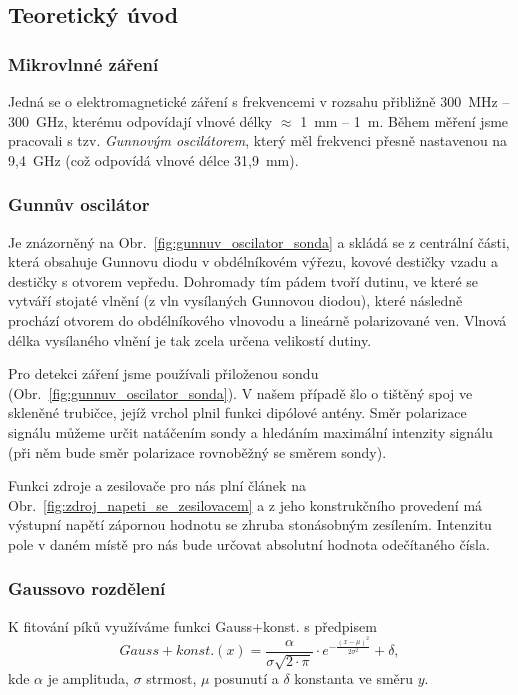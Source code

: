 \documentclass[english]{article}
\begin{document}
	\subsection{Teoretický úvod}
		\subsubsection{Mikrovlnné záření}
				Jedná se o elektromagnetické záření s frekvencemi v rozsahu přibližně 300~MHz -- 300~GHz, kterému odpovídají vlnové délky $\approx$ 1~mm -- 1~m. Během měření jsme pracovali s tzv. \emph{Gunnovým oscilátorem}, který měl frekvenci přesně nastavenou na 9,4~GHz (což odpovídá vlnové délce 31,9~mm).
						
		\subsubsection{Gunnův oscilátor}
				Je znázorněný na Obr.~\ref{fig:gunnuv_oscilator_sonda} a skládá se z centrální části, která obsahuje Gunnovu diodu v obdélníkovém výřezu, kovové destičky vzadu a destičky s otvorem vepředu. Dohromady tím pádem tvoří dutinu, ve které se vytváří stojaté vlnění (z vln vysílaných Gunnovou diodou), které následně prochází otvorem do obdélníkového vlnovodu a lineárně polarizované ven. Vlnová délka vysílaného vlnění je tak zcela určena velikostí dutiny. 
				
				Pro detekci záření jsme používali přiloženou sondu (Obr.~\ref{fig:gunnuv_oscilator_sonda}). V našem případě šlo o tištěný spoj ve skleněné trubičce, jejíž vrchol plnil funkci dipólové antény. Směr polarizace signálu můžeme určit natáčením sondy a hledáním maximální intenzity signálu (při něm bude směr polarizace rovnoběžný se směrem sondy). 
				
				Funkci zdroje a zesilovače pro nás plní článek na Obr.~\ref{fig:zdroj_napeti_se_zesilovacem} a z jeho konstrukčního provedení má výstupní napětí zápornou hodnotu se zhruba stonásobným zesílením. Intenzitu pole v daném místě pro nás bude určovat absolutní hodnota odečítaného čísla.
							
		\subsubsection{Gaussovo rozdělení}
				K fitování píků využíváme funkci Gauss+konst. s předpisem
				\begin{equation}
						Gauss+konst.(x) = \frac{\alpha}{\sigma \sqrt{2\cdot \pi}} \cdot e^{-\frac{(x-\mu)^2}{2\sigma^2}} + \delta,
				\label{eq:gauss}
				\end{equation}
				kde $\alpha$ je amplituda, $\sigma$ strmost, $\mu$ posunutí a $\delta$ konstanta ve směru $y$.
			
\end{document}
